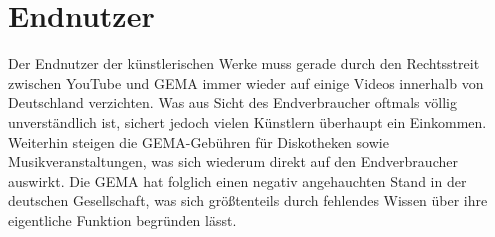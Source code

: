 \section{Endnutzer}
Der Endnutzer der künstlerischen Werke muss gerade durch den Rechtsstreit zwischen YouTube und GEMA immer wieder auf einige Videos innerhalb von Deutschland verzichten. Was aus Sicht des Endverbraucher oftmals völlig unverständlich ist, sichert jedoch vielen Künstlern überhaupt ein Einkommen. Weiterhin steigen die GEMA-Gebühren für Diskotheken sowie Musikveranstaltungen, was sich wiederum direkt auf den Endverbraucher auswirkt. Die GEMA hat folglich einen negativ angehauchten Stand in der deutschen Gesellschaft, was sich größtenteils durch fehlendes Wissen über ihre eigentliche Funktion begründen lässt.